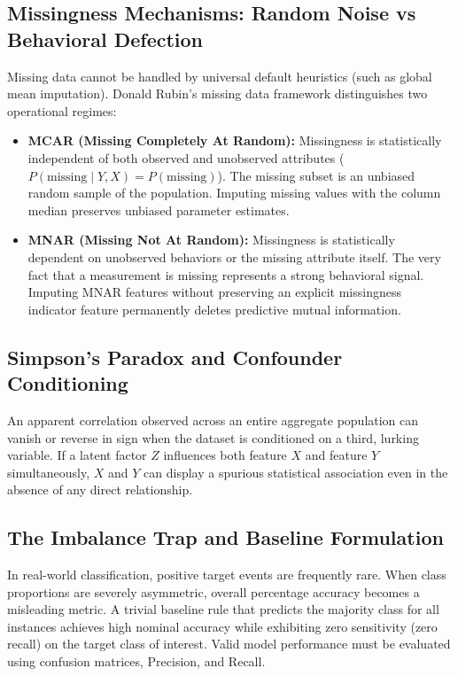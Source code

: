 \documentclass[11pt,a4paper]{article}
\begin{document}
\subsection*{Missingness Mechanisms: Random Noise vs Behavioral Defection}
Missing data cannot be handled by universal default heuristics (such as global mean imputation). Donald Rubin's missing data framework distinguishes two operational regimes:
\begin{itemize}[leftmargin=*]
    \item \textbf{MCAR (Missing Completely At Random):} Missingness is statistically independent of both observed and unobserved attributes ($P(\text{missing} \mid Y, X) = P(\text{missing})$). The missing subset is an unbiased random sample of the population. Imputing missing values with the column median preserves unbiased parameter estimates.
    \item \textbf{MNAR (Missing Not At Random):} Missingness is statistically dependent on unobserved behaviors or the missing attribute itself. The very fact that a measurement is missing represents a strong behavioral signal. Imputing MNAR features without preserving an explicit missingness indicator feature permanently deletes predictive mutual information.
\end{itemize}

\subsection*{Simpson's Paradox and Confounder Conditioning}
An apparent correlation observed across an entire aggregate population can vanish or reverse in sign when the dataset is conditioned on a third, lurking variable. If a latent factor $Z$ influences both feature $X$ and feature $Y$ simultaneously, $X$ and $Y$ can display a spurious statistical association even in the absence of any direct relationship.

\subsection*{The Imbalance Trap and Baseline Formulation}
In real-world classification, positive target events are frequently rare. When class proportions are severely asymmetric, overall percentage accuracy becomes a misleading metric. A trivial baseline rule that predicts the majority class for all instances achieves high nominal accuracy while exhibiting zero sensitivity (zero recall) on the target class of interest. Valid model performance must be evaluated using confusion matrices, Precision, and Recall.
\end{document}
